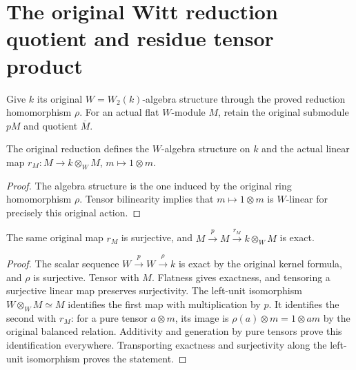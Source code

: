 \section{The original Witt reduction quotient and residue tensor product}
\label{sec:witt-two-residue-tensor}

Give $k$ its original $W=W_2(k)$-algebra structure
through the proved reduction homomorphism $\rho$.
For an actual flat $W$-module $M$, retain the
original submodule $pM$ and quotient $\overline M$.

\begin{definition}
\label{def:witt-two-residue-tensor-map}
\leanok
{}
The original reduction defines the $W$-algebra
structure on $k$ and the actual linear map
$r_M:M\to k\otimes_W M$, $m\mapsto1\otimes m$.
\end{definition}
\begin{proof}
The algebra structure is the one induced by the
original ring homomorphism $\rho$. Tensor
bilinearity implies that $m\mapsto1\otimes m$
is $W$-linear for precisely this original action.
\end{proof}

\begin{theorem}
\label{thm:witt-two-residue-tensor-exact}
\leanok
{}
The same original map $r_M$ is surjective, and
$M\xrightarrow{p}M\xrightarrow{r_M}k\otimes_W M$
is exact.
\end{theorem}
\begin{proof}
The scalar sequence $W\xrightarrow{p}W
\xrightarrow{\rho}k$ is exact by the original
kernel formula, and $\rho$ is surjective. Tensor
with $M$. Flatness gives exactness, and tensoring
a surjective linear map preserves surjectivity.
The left-unit isomorphism $W\otimes_W M\simeq M$
identifies the first map with multiplication by $p$.
It identifies the second with $r_M$: for a pure
tensor $a\otimes m$, its image is
$\rho(a)\otimes m=1\otimes am$ by the original
balanced relation. Additivity and generation by
pure tensors prove this identification everywhere.
Transporting exactness and surjectivity along the
left-unit isomorphism proves the statement.
\end{proof}

